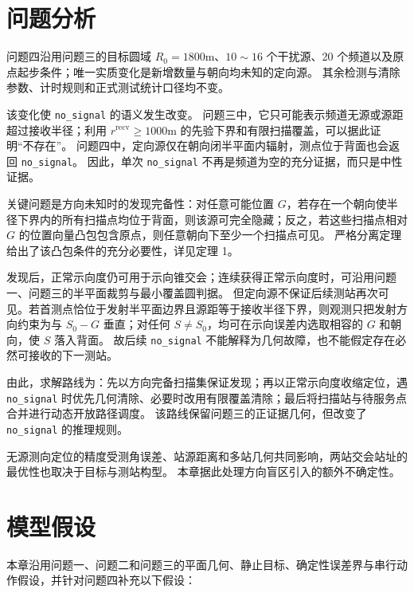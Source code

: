 
\section{问题分析}

问题四沿用问题三的目标圆域 $R_0=1800\mathrm{m}$、$10\sim16$ 个干扰源、20 个频道以及原点起步条件；唯一实质变化是新增数量与朝向均未知的定向源。
其余检测与清除参数、计时规则和正式测试统计口径均不变。

该变化使 \texttt{no\_signal} 的语义发生改变。
问题三中，它只可能表示频道无源或源距超过接收半径；利用 $r^{\mathrm{recv}}\ge1000\mathrm{m}$ 的先验下界和有限扫描覆盖，可以据此证明“不存在”。
问题四中，定向源仅在朝向闭半平面内辐射，测点位于背面也会返回 \texttt{no\_signal}。
因此，单次 \texttt{no\_signal} 不再是频道为空的充分证据，而只是中性证据。

关键问题是方向未知时的发现完备性：对任意可能位置 $G$，若存在一个朝向使半径下界内的所有扫描点均位于背面，则该源可完全隐藏；反之，若这些扫描点相对 $G$ 的位置向量凸包包含原点，则任意朝向下至少一个扫描点可见。
严格分离定理给出了该凸包条件的充分必要性，详见定理 1。

发现后，正常示向度仍可用于示向锥交会；连续获得正常示向度时，可沿用问题一、问题三的半平面裁剪与最小覆盖圆判据。
但定向源不保证后续测站再次可见。若首测点恰位于发射半平面边界且源距等于接收半径下界，则观测只把发射方向约束为与 $S_0-G$ 垂直；对任何 $S\ne S_0$，均可在示向误差内选取相容的 $G$ 和朝向，使 $S$ 落入背面。
故后续 \texttt{no\_signal} 不能解释为几何故障，也不能假定存在必然可接收的下一测站。

由此，求解路线为：先以方向完备扫描集保证发现；再以正常示向度收缩定位，遇 \texttt{no\_signal} 时优先几何清除、必要时改用有限覆盖清除；最后将扫描站与待服务点合并进行动态开放路径调度。
该路线保留问题三的正证据几何，但改变了 \texttt{no\_signal} 的推理规则。

无源测向定位的精度受测角误差、站源距离和多站几何共同影响，两站交会站址的最优性也取决于目标与测站构型\cite{wang2019,zheng2014,uav2019,dogancay2005,bishop2010}。
本章据此处理方向盲区引入的额外不确定性。

\section{模型假设}

本章沿用问题一、问题二和问题三的平面几何、静止目标、确定性误差界与串行动作假设，并针对问题四补充以下假设：

